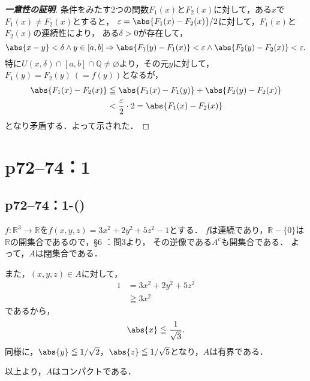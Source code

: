 \documentclass[a4paper,10pt,fleqn]{ltjsarticle}
\begin{document}
\begin{leftbar}
    \begin{proof}[\textup{\textbf{一意性の証明}}]
        条件をみたす2つの関数$F_1 (x)$と$F_2(x)$に対して，ある$x$で$F_1(x) \ne F_2(x)$とすると，
        $\varepsilon = \abs{F_1(x) - F_2(x)}/2$に対して，$F_1(x)$と$F_2(x)$の連続性により，
        ある$\delta >0$が存在して，
        \[
            \abs{x-y}<\delta \land y \in [a,b] \Rightarrow \abs{F_1(y)-F_1(x)}<\varepsilon \land  \abs{F_2(y)-F_2(x)}<\varepsilon.
        \]
        特に$ U (x,\delta) \cap [a,b] \cap \mathbb{Q} \ne \varnothing$より，その元$y$に対して，
        $F_1 (y)=F_2(y)~(=f(y))$となるが，
        \begin{align*}
            \abs{F_1(x)-F_2(x)} & \leqq \abs{F_1(x)-F_1(y)} + \abs{F_2(y)-F_2(x)}          \\
                                & < \frac{\varepsilon}{2} \cdot 2  = \abs{F_1(x) - F_2(x)}
        \end{align*}
        となり矛盾する．よって示された．
    \end{proof}
\end{leftbar}

\newpage

\section*{p72--74：1}


\subsection*{p72--74：1-()}

\begin{tleftbar}
    $ f\colon \mathbb{R}^3 \to \mathbb{R}$を$f(x,y,z)=3x^2 + 2y^2 + 5z^2 -1$とする．
    $f$は連続であり，$\mathbb{R} -\{ 0 \}$は$\mathbb{R}$の開集合であるので，\S 6 ：問3より，
    その逆像である$A^c$も開集合である．
    よって，$A$は閉集合である．

    また，$(x,y,z) \in A$に対して，
    \begin{align*}
        1 & = 3x^2 + 2y^2 + 5z^2 \\
          & \geqq 3x^2
    \end{align*}
    であるから，
    \[
        \abs{x} \leqq \frac{1}{\sqrt{3}}.
    \]
    同様に，$ \abs{y} \leqq 1/\sqrt{2}$，$\abs{z} \leqq 1/\sqrt{5}$となり，$A$は有界である．

    以上より，$A$はコンパクトである．
\end{tleftbar}
\end{document}
